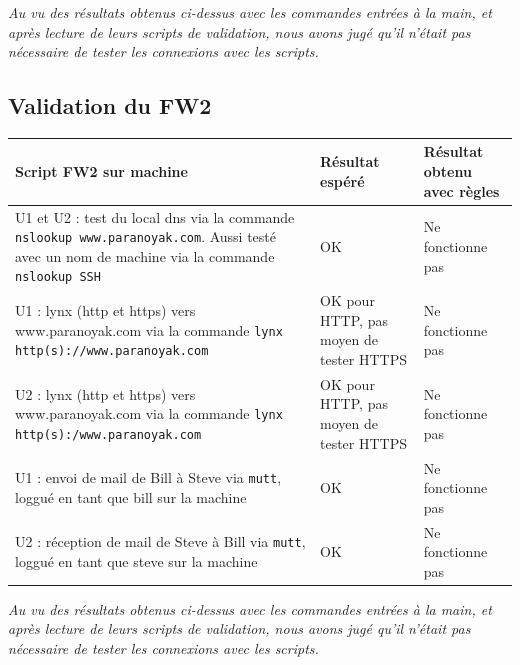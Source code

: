 \documentclass[11pt,a4paper]{article}
\begin{document}
\emph{Au vu des résultats obtenus ci-dessus avec les commandes entrées à la main, et après lecture de leurs scripts de validation, nous avons jugé qu'il n'était pas nécessaire de tester les connexions avec les scripts.}
\subsection{Validation du FW2}
\begin{longtable}{|p{8cm}|p{3cm}|p{3cm}|}
\hline
Script FW2 sur machine & Résultat espéré & Résultat obtenu avec règles\\
\hline
U1 et U2 : test du local dns via la commande \texttt{nslookup www.paranoyak.com}. Aussi testé avec un nom de machine via la commande \texttt{nslookup SSH} \ & OK  & Ne fonctionne pas  \\
\hline 
U1 : lynx (http et https) vers www.paranoyak.com via la commande \texttt{lynx http(s)://www.paranoyak.com} &  OK pour HTTP, pas moyen de tester HTTPS & Ne fonctionne pas \\
\hline 
U2 : lynx (http et https) vers www.paranoyak.com via la commande \texttt{lynx http(s):/www.paranoyak.com} &  OK pour HTTP, pas moyen de tester HTTPS & Ne fonctionne pas\\
\hline 
U1 : envoi de mail de Bill à Steve via \texttt{mutt}, loggué en tant que bill sur la machine & OK & Ne fonctionne pas \\
\hline
U2 : réception de mail de Steve à Bill via \texttt{mutt}, loggué en tant que steve sur la machine & OK & Ne fonctionne pas \\
\hline
\end{longtable}
\emph{Au vu des résultats obtenus ci-dessus avec les commandes entrées à la main, et après lecture de leurs scripts de validation, nous avons jugé qu'il n'était pas nécessaire de tester les connexions avec les scripts.}
\end{document}
